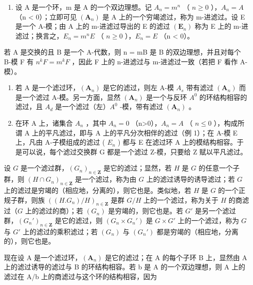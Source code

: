 \begin{enumerate}
\def\labelenumi{(\arabic{enumi})}
\setcounter{enumi}{2}
\tightlist
\item
  设 A 是一个环，m 是 A 的一个双边理想。记 \(A_{n} = m^{n}\) （ \(n \geqslant 0\) ），\(A_{n} = A\) （n \textless{} 0）；立即可见 \((\mathbf{A}_{n})\) 是 A 上的一个穷竭滤过，称为 m-进滤过。设 E 是一个 A-模；由 A 上的 m-进滤过导出的 E 的滤过 \((\mathbf{E}_{n})\) 称为 E 上的 m-进滤过；换言之，\(E_{n} = m^{n}E\) （ \(n \geqslant 0\) ），\(E_{n} = E\) （n \textless{} 0）。
\end{enumerate}

若 A 是交换的且 B 是一个 A-代数，则 n = mB 是 B 的双边理想，并且对每个 B-模 F 有 \(n^{k}F = m^{k}F\) ，因此 F 上的 n-进滤过与 m-进滤过一致（若把 F 看作 A-模）。

\begin{enumerate}
\def\labelenumi{(\arabic{enumi})}
\setcounter{enumi}{3}
\item
  若 A 是一个滤过环，\((\mathbf{A}_{n})\) 是它的滤过，则左 A-模 \(A_{s}\) 带有滤过 \((\mathbf{A}_{n})\) 而是一个滤过 A-模。另一方面，显然 \((\mathbf{A}_{n})\) 是一个与反环 \(A^{0}\) 的环结构相容的滤过，且 \(A_{d}\) 是一个滤过（左）\(A^{0}\) -模，带有滤过 \((\mathbf{A}_{n})\) 。
\item
  在环 A 上，诸集合 \(A_{n}\) ，其中 \(A_{n}=0\) （n\textgreater0），\(A_{n}=A\) （ \(n\leqslant0\) ），构成所谓 A 上的平凡滤过，即与 A 上的平凡分次相伴的滤过（例 1）；在 A-模 E 上，凡由 A-子模组成的滤过 ( \(E_{n}\) ) 都与 E 在滤过环 A 上的模结构相容。于是可以说，每个滤过交换群 G 都是一个滤过 Z-模，只要给 Z 赋以平凡滤过。
\end{enumerate}

设 \(G\) 是一个滤过群，\((G_n)_{n \in \mathbf{Z}}\) 是它的滤过；显然，若 \(H\) 是 \(G\) 的任意一个子群，则 \((H \cap G_n)_{n \in \mathbf{Z}}\) 是一个滤过，称为由 \(G\) 上的滤过诱导的诱导滤过；若 \(G\) 上的滤过是穷竭的（相应地，分离的），则它也是。类似地，若 \(H\) 是 \(G\) 的一个正规子群，则族 \(((H.G_n)/H)_{n \in \mathbf{Z}}\) 是群 \(G/H\) 上的一个滤过，称为关于 \(H\) 的商滤过（\(G\) 上的滤过的商）；若 \((G_n)\) 是穷竭的，则它也是。若 \(G'\) 是另一个滤过群，\((G_n')_{n \in \mathbf{Z}}\) 是它的滤过，则 \((G_n \times G_n')\) 是 \(G \times G'\) 上的一个滤过，称为 \(G\) 与 \(G'\) 上的滤过的乘积滤过；若 \((G_n)\) 与 \((G_n')\) 都是穷竭的（相应地，分离的），则它也是。

现在设 A 是一个滤过环，\((\mathbf{A}_{n})\) 是它的滤过；在 A 的每个子环 B 上，显然由 A 上的滤过诱导的滤过与 B 的环结构相容。若 b 是 A 的一个双边理想，则 A 上的滤过在 A/b 上的商滤过与这个环的结构相容，因为

